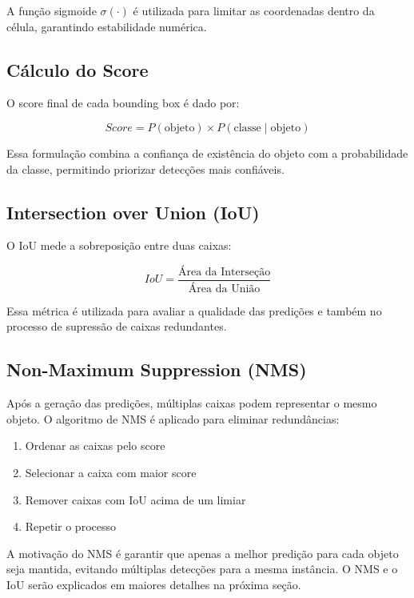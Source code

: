 \documentclass[conference]{IEEEtran}
\begin{document}
A função sigmoide $\sigma(\cdot)$ é utilizada para limitar as coordenadas dentro da célula, garantindo estabilidade numérica.

\subsection{Cálculo do Score}

O score final de cada bounding box é dado por:

\begin{equation}
Score = P(\text{objeto}) \times P(\text{classe} \mid \text{objeto})
\end{equation}

Essa formulação combina a confiança de existência do objeto com a probabilidade da classe, permitindo priorizar detecções mais confiáveis.

\subsection{Intersection over Union (IoU)}

O IoU mede a sobreposição entre duas caixas:

\begin{equation}
IoU = \frac{\text{Área da Interseção}}{\text{Área da União}}
\end{equation}

Essa métrica é utilizada para avaliar a qualidade das predições e também no processo de supressão de caixas redundantes.

\subsection{Non-Maximum Suppression (NMS)}

Após a geração das predições, múltiplas caixas podem representar o mesmo objeto. O algoritmo de NMS é aplicado para eliminar redundâncias:

\begin{enumerate}
    \item Ordenar as caixas pelo score
    \item Selecionar a caixa com maior score
    \item Remover caixas com IoU acima de um limiar
    \item Repetir o processo
\end{enumerate}

A motivação do NMS é garantir que apenas a melhor predição para cada objeto seja mantida, evitando múltiplas detecções para a mesma instância. O NMS e o IoU serão explicados em maiores detalhes na próxima seção.
\end{document}
